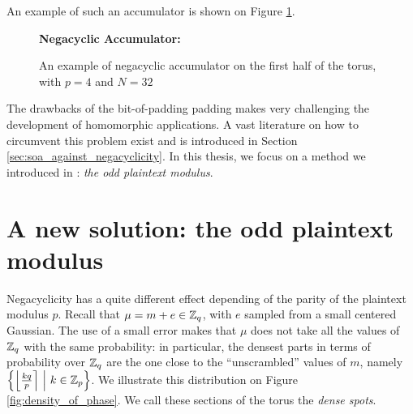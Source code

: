 An example of such an accumulator is shown on Figure \ref{fig:negacyclic_accumulator}.

\begin{figure}[H]
	\centering
				
	\vspace{1.5em}
	
	\textbf{Negacyclic Accumulator:}\\[0.5em]
	
	\caption{An example of negacyclic accumulator on the first half of the torus, with $p=4$ and $N = 32$}
	\label{fig:negacyclic_accumulator}
\end{figure}




The drawbacks of the bit-of-padding padding makes very challenging the development of homomorphic applications. A vast literature on how to circumvent this problem exist and is introduced in Section \ref{sec:soa_against_negacyclicity}. In this thesis, we focus on a method we introduced in \cite{TCHES:BonPoiRiv24}: \textit{the odd plaintext modulus}.

\section{A new solution: the odd plaintext modulus}

Negacyclicity has a quite different effect depending of the parity of the plaintext modulus $p$. Recall that $\mu = m + e \in \mathbb{Z}_q$, with $e$ sampled from a small centered Gaussian. The use of a small error makes that $\mu$ does not take all the values of $\mathbb{Z}_q$ with the same probability: in particular, the densest parts in terms of probability over $\mathbb{Z}_q$ are the one close to the ``unscrambled'' values of $m$, namely $\left \{ \left \lfloor \frac {k q}{p} \right \rceil ~\middle |~ k \in \mathbb{Z}_p \right \}$. We illustrate this distribution on Figure \ref{fig:density_of_phase}. We call these sections of the torus the \emph{dense spots}.


